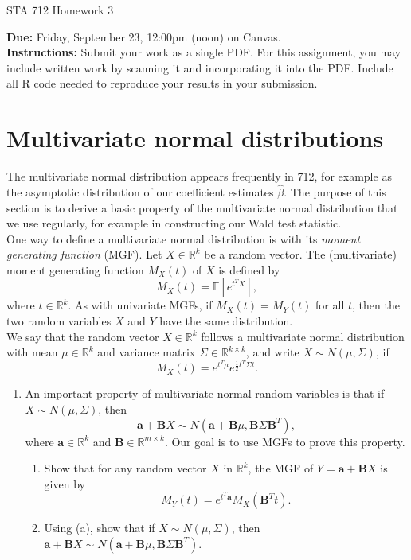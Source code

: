 \documentclass[11pt]{article}
\begin{document}
\begin{center}
\Large
STA 712 Homework 3\\
\normalsize
\vspace{5mm}
\end{center}

\noindent \textbf{Due:} Friday, September 23, 12:00pm (noon) on Canvas.\\ 

\noindent \textbf{Instructions:} Submit your work as a single PDF. For this assignment, you may include written work by scanning it and incorporating it into the PDF. Include all R code needed to reproduce your results in your submission.

\section*{Multivariate normal distributions}

The multivariate normal distribution appears frequently in 712, for example as the asymptotic distribution of our coefficient estimates $\widehat{\beta}$. The purpose of this section is to derive a basic property of the multivariate normal distribution that we use regularly, for example in constructing our Wald test statistic.\\


\noindent One way to define a multivariate normal distribution is with its \textit{moment generating function} (MGF).  Let $X \in \mathbb{R}^k$ be a random vector. The (multivariate) moment generating function $M_X(t)$ of $X$ is defined by
$$M_X(t) = \mathbb{E}[e^{t^T X}],$$
where $t \in \mathbb{R}^k$. As with univariate MGFs, if $M_X(t) = M_Y(t)$ for all $t$, then the two random variables $X$ and $Y$ have the same distribution.\\

\noindent We say that the random vector $X \in \mathbb{R}^k$ follows a multivariate normal distribution with mean $\mu \in \mathbb{R}^k$ and variance matrix $\Sigma \in \mathbb{R}^{k \times k}$, and write $X \sim N(\mu, \Sigma)$, if 
$$M_X(t) = e^{t^T \mu} e^{\frac{1}{2} t^T \Sigma t}.$$

\begin{enumerate}
\item An important property of multivariate normal random variables is that if $X \sim N(\mu, \Sigma)$, then
$$\bm{a} + \bm{B} X \sim N(\bm{a} + \bm{B} \mu, \bm{B} \Sigma \bm{B}^T),$$
where $\bm{a} \in \mathbb{R}^k$ and $\bm{B} \in \mathbb{R}^{m \times k}$. Our goal is to use MGFs to prove this property.

\begin{enumerate}
\item Show that for any random vector $X$ in $\mathbb{R}^k$, the MGF of $Y = \bm{a} + \bm{B} X$ is given by
$$M_Y(t) = e^{t^T \bm{a}} M_X(\bm{B}^T t).$$

\item Using (a), show that if $X \sim N(\mu, \Sigma)$, then $\bm{a} + \bm{B} X \sim N(\bm{a} + \bm{B} \mu, \bm{B} \Sigma \bm{B}^T)$.
\end{enumerate}
\end{enumerate}
\end{document}
